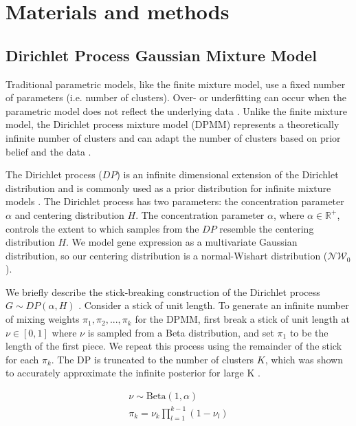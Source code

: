 \documentclass[10pt,letterpaper]{article}
\begin{document}
\section*{Materials and methods}
\subsection*{Dirichlet Process Gaussian Mixture Model}

Traditional parametric models, like the finite mixture model, use a fixed number of parameters (i.e. number of clusters). Over- or underfitting can occur when the parametric model does not reflect the underlying data \cite{teh2010dirichlet}. Unlike the finite mixture model, the Dirichlet process mixture model (DPMM) represents a theoretically infinite number of clusters and can adapt the number of clusters based on prior belief and the data \cite{gelmanBayesianDataAnalysis2013, antoniakMixturesDirichletProcesses1974, teh2010dirichlet}.

The Dirichlet process ($DP$) is an infinite dimensional extension of the Dirichlet distribution \cite{fergusonBayesianAnalysisNonparametric1973} and is commonly used as a prior distribution for infinite mixture models \cite{muller2004nonparametric, gorurDirichletProcessGaussian2010}. The Dirichlet process has two parameters: the concentration parameter $\alpha$ and centering distribution $H$. The concentration parameter $\alpha$, where $\alpha \in \mathbb{R}^+$, controls the extent to which samples from the $DP$ resemble the centering distribution $H$. We model gene expression as a multivariate Gaussian distribution, so our centering distribution is a normal-Wishart distribution ($\mathcal{NW}_0$).

We briefly describe the stick-breaking construction of the Dirichlet process $G \sim DP(\alpha, H)$ \cite{hughes2013memoized, teh2010dirichlet, gelmanBayesianDataAnalysis2013, fergusonBayesianAnalysisNonparametric1973}. Consider a stick of unit length. To generate an infinite number of mixing weights $\pi_1, \pi_2, ..., \pi_k$ for the DPMM, first break a stick of unit length at $\nu \in [0, 1]$ where $\nu$ is sampled from a Beta distribution, and set $\pi_1$ to be the length of the first piece. We repeat this process using the remainder of the stick for each $\pi_k$. The DP is truncated to the number of clusters $K$, which was shown to accurately approximate the infinite posterior for large K \cite{hughes2013memoized}.


\begin{gather}
\label{eq:dp}
\nu \sim \text{Beta}(1, \alpha) \\
\pi_k = \nu_k \prod_{l=1}^{k-1}(1 - \nu_l)
\end{gather}
\end{document}

